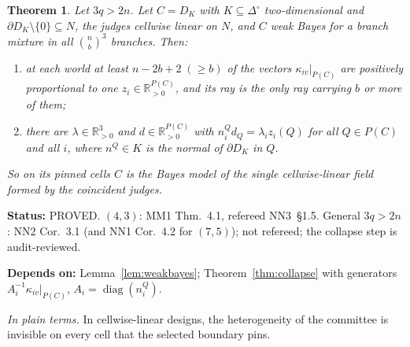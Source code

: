 \documentclass[11pt]{article}
\newtheorem{theorem}{Theorem}[section]
\theoremstyle{definition}
\theoremstyle{remark}
\newcommand{\R}{\mathbb R}
\newcommand{\Di}{\Delta^{\circ}}
\newcommand{\src}[1]{\textsf{#1}}
\newcommand{\status}[1]{\par\smallskip\noindent\textbf{Status:} #1\par}
\newcommand{\deps}[1]{\noindent\textbf{Depends on:} #1\par}
\newcommand{\inwords}[1]{\noindent\textit{In plain terms.} #1\par\smallskip}
\begin{document}
\begin{theorem}\label{thm:cellwise}
Let $3q>2n$. Let $C=D_K$ with $K\subseteq\Di$ two-dimensional and $\partial D_K\setminus\{0\}\subseteq N$, the judges cellwise linear on $N$, and $C$ weak Bayes for a branch mixture in all $\binom nb^3$ branches. Then:
\begin{enumerate}[label=(\alph*)]
\item at each world at least $n-2b+2\;(\ge b)$ of the vectors $\kappa_{iv}|_{P(C)}$ are positively proportional to one $z_i\in\R^{P(C)}_{>0}$, and its ray is the only ray carrying $b$ or more of them;
\item there are $\lambda\in\R^3_{>0}$ and $d\in\R^{P(C)}_{>0}$ with $n^Q_id_Q=\lambda_iz_i(Q)$ for all $Q\in P(C)$ and all $i$, where $n^Q\in K$ is the normal of $\partial D_K$ in $Q$.
\end{enumerate}
So on its pinned cells $C$ is the Bayes model of the single cellwise-linear field formed by the coincident judges.
\end{theorem}
\status{PROVED. $(4,3)$: \src{MM1} Thm.~4.1, refereed \src{NN3}~\S1.5. General $3q>2n$: \src{NN2} Cor.~3.1 (and \src{NN1} Cor.~4.2 for $(7,5)$); not refereed; the collapse step is audit-reviewed.}
\deps{Lemma~\ref{lem:weakbayes}; Theorem~\ref{thm:collapse} with generators $A_i^{-1}\kappa_{iv}|_{P(C)}$, $A_i=\operatorname{diag}(n^Q_i)$.}
\inwords{In cellwise-linear designs, the heterogeneity of the committee is invisible on every cell that the selected boundary pins.}
\end{document}
